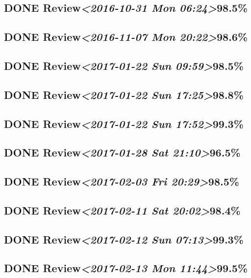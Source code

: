 \documentclass[11pt]{ctexart}
\begin{document}
\subsection{{\bfseries\sffamily DONE} Review\textit{<2016-10-31 Mon 06:24>}98.5\%}
\label{sec:org5084221}
\subsection{{\bfseries\sffamily DONE} Review\textit{<2016-11-07 Mon 20:22>}98.6\%}
\label{sec:org0cfa8aa}
\subsection{{\bfseries\sffamily DONE} Review\textit{<2017-01-22 Sun 09:59>}98.5\%}
\label{sec:org9bd9938}
\subsection{{\bfseries\sffamily DONE} Review\textit{<2017-01-22 Sun 17:25>}98.8\%}
\label{sec:orgb78b32e}
\subsection{{\bfseries\sffamily DONE} Review\textit{<2017-01-22 Sun 17:52>}99.3\%}
\label{sec:org15d3a35}
\subsection{{\bfseries\sffamily DONE} Review\textit{<2017-01-28 Sat 21:10>}96.5\%}
\label{sec:org282bc38}
\subsection{{\bfseries\sffamily DONE} Review\textit{<2017-02-03 Fri 20:29>}98.5\%}
\label{sec:orgd49177a}
\subsection{{\bfseries\sffamily DONE} Review\textit{<2017-02-11 Sat 20:02>}98.4\%}
\label{sec:orgb002ce4}
\subsection{{\bfseries\sffamily DONE} Review\textit{<2017-02-12 Sun 07:13>}99.3\%}
\label{sec:orgea8f523}
\subsection{{\bfseries\sffamily DONE} Review\textit{<2017-02-13 Mon 11:44>}99.5\%}
\label{sec:orgd32d08c}
\end{document}
